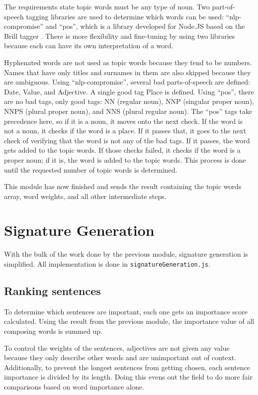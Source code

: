 \documentclass[11pt,titlepage]{report}
\begin{document}
The requirements state topic words must be any type of noun. Two part-of-speech tagging libraries are used to determine which words can be used: ``nlp-compromise'' and ``pos'', which is a library developed for Node.JS based on the Brill tagger \cite{pos-library}. There is more flexibility and fine-tuning by using two libraries because each can have its own interpretation of a word.

Hyphenated words are not used as topic words because they tend to be numbers. Names that have only titles and surnames in them are also skipped because they are ambiguous. Using ``nlp-compromise'', several bad parts-of-speech are defined: Date, Value, and Adjective. A single good tag Place is defined. Using ``pos'', there are no bad tags, only good tags: NN (regular noun), NNP (singular proper noun), NNPS (plural proper noun), and NNS (plural regular noun). The ``pos'' tags take precedence here, so if it is a noun, it moves onto the next check. If the word is not a noun, it checks if the word is a place. If it passes that, it goes to the next check of verifying that the word is not any of the bad tags. If it passes, the word gets added to the topic words. If those checks failed, it checks if the word is a proper noun; if it is, the word is added to the topic words. This process is done until the requested number of topic words is determined. 

This module has now finished and sends the result containing the topic words array, word weights, and all other intermediate steps.

\section{Signature Generation}
With the bulk of the work done by the previous module, signature generation is simplified. All implementation is done in \lstinline|signatureGeneration.js|.
\subsection{Ranking sentences}
To determine which sentences are important, each one gets an importance score calculated. Using the result from the previous module, the importance value of all composing words is summed up. 

To control the weights of the sentences, adjectives are not given any value because they only describe other words and are unimportant out of context. Additionally, to prevent the longest sentences from getting chosen, each sentence importance is divided by its length. Doing this evens out the field to do more fair comparisons based on word importance alone.
\end{document}
